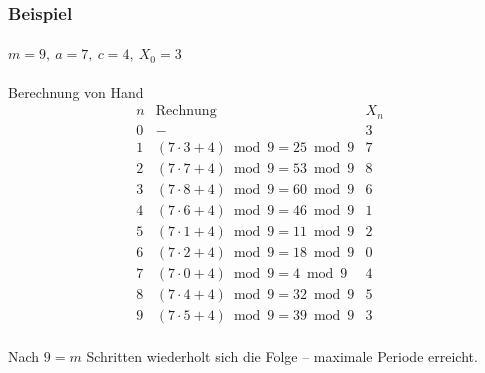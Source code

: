 \documentclass{beamer}
\begin{document}
\begin{frame}
    \frametitle{Beispiel}
    \framesubtitle{$m=9,\ a=7,\ c=4,\ X_0=3$}

\begin{block}{Berechnung von Hand}
\[
\begin{array}{c|l|c}
n & \text{Rechnung} & X_n \\ \hline
0 & -                                       & 3 \\
1 & (7\cdot 3 + 4) \bmod 9 = 25 \bmod 9     & 7 \\
2 & (7\cdot 7 + 4) \bmod 9 = 53 \bmod 9     & 8 \\
3 & (7\cdot 8 + 4) \bmod 9 = 60 \bmod 9     & 6 \\
4 & (7\cdot 6 + 4) \bmod 9 = 46 \bmod 9     & 1 \\
5 & (7\cdot 1 + 4) \bmod 9 = 11 \bmod 9     & 2 \\
6 & (7\cdot 2 + 4) \bmod 9 = 18 \bmod 9     & 0 \\
7 & (7\cdot 0 + 4) \bmod 9 =  4 \bmod 9     & 4 \\
8 & (7\cdot 4 + 4) \bmod 9 = 32 \bmod 9     & 5 \\
9 & (7\cdot 5 + 4) \bmod 9 = 39 \bmod 9     & 3 \\
\end{array}
\]
\end{block}

Nach $9 = m$ Schritten wiederholt sich die Folge -- maximale Periode erreicht.

\end{frame}
\end{document}

